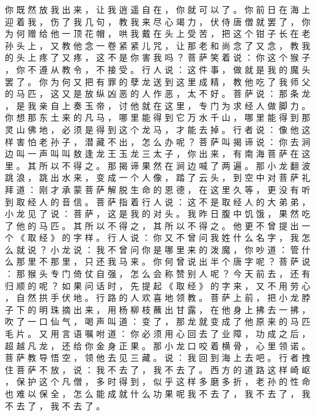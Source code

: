{你 既 然 放 我 出 来 ， 让 我 逍 遥 自 在 ， 你 就 可 以 了 。
你 前 日 在 海 上 迎 着 我 ， 伤 了 我 几 句 ， 教 我 来 尽 心 竭 力 ， 伏 侍 唐 僧 就 罢 了 ， 你 为 何 赠 给 他 一 顶 花 帽 ， 哄 我 戴 在 头 上 受 苦 ， 把 这 个 钳 子 长 在 老 孙 头 上 ， 又 教 他 念 一 卷 紧 紧 儿 咒 ， 让 那 老 和 尚 念 了 又 念 ， 教 我 的 头 上 疼 了 又 疼 ， 这 不 是 你 害 我 吗 ？ 菩 萨 笑 着 说 ： 你 这 个 猴 子 ， 你 不 遵 从 教 令 ， 不 接 受 。
行 人 说 ： 这 件 事 ， 做 就 是 我 的 魔 头 罢 了 。
你 为 何 又 把 有 罪 的 孽 龙 送 到 这 里 成 精 ， 教 他 吃 了 我 师 父 的 马 匹 ， 这 又 是 放 纵 凶 恶 的 人 作 恶 ， 太 不 好 。
菩 萨 说 ： 那 条 龙 ， 是 我 亲 自 上 奏 玉 帝 ， 讨 他 就 在 这 里 ， 专 门 为 求 经 人 做 脚 力 。
你 想 那 东 土 来 的 凡 马 ， 哪 里 能 得 到 它 万 水 千 山 ， 哪 里 能 得 到 那 灵 山 佛 地 ， 必 须 是 得 到 这 个 龙 马 ， 才 能 去 掉 。
行 者 说 ： 像 他 这 样 害 怕 老 孙 子 ， 潜 藏 不 出 ， 怎 么 办 呢 ？ 菩 萨 叫 揭 谛 说 ： 你 去 涧 边 叫 一 声 叫 叫 敖 逢 龙 王 玉 龙 三 太 子 ， 你 出 来 ， 有 南 海 菩 萨 在 这 里 。
其 所 以 不 得 之 。
那 揭 谛 果 然 在 涧 边 喊 了 两 遍 。
那 小 龙 翻 波 跳 浪 ， 跳 出 水 来 ， 变 成 一 个 人 像 ， 踏 了 云 头 ， 到 空 中 对 菩 萨 礼 拜 道 ： 刚 才 承 蒙 菩 萨 解 脱 生 命 的 恩 德 ， 在 这 里 久 等 ， 更 没 有 听 到 取 经 人 的 音 信 。
菩 萨 指 着 行 人 说 ： 这 不 是 取 经 人 的 大 弟 弟 ， 小 龙 见 了 说 ： 菩 萨 ， 这 是 我 的 对 头 。
我 昨 日 腹 中 饥 饿 ， 果 然 吃 了 他 的 马 匹 。
其 所 以 不 得 之 ， 其 所 以 不 得 之 。
他 更 不 曾 提 出 一 个 《 取 经 》 的 字 样 。
行 人 说 ： 你 又 不 曾 问 我 姓 什 么 名 字 ， 我 怎 么 就 说 ？ 小 龙 说 ： 我 不 曾 问 你 是 哪 里 来 的 泼 魔 ， 你 吵 道 ： 管 什 么 那 里 不 那 里 ， 只 还 我 马 来 。
你 何 曾 说 出 半 个 唐 字 呢 ？ 菩 萨 说 ： 那 猴 头 专 门 倚 仗 自 强 ， 怎 么 会 称 赞 别 人 呢 ？ 今 天 前 去 ， 还 有 归 顺 的 呢 ？
如 果 问 话 时 ， 先 提 起 《 取 经 》 的 字 来 ， 又 不 用 劳 心 ， 自 然 拱 手 伏 地 。
行 路 的 人 欢 喜 地 领 教 。
菩 萨 上 前 ， 把 小 龙 脖 子 下 的 明 珠 摘 出 来 ， 用 杨 柳 枝 蘸 出 甘 露 ， 在 他 身 上 拂 去 一 拂 ， 吹 了 一 口 仙 气 ， 喝 声 叫 道 ： 变 了 ， 那 龙 就 变 成 了 他 原 来 的 马 匹 毛 片 。
又 用 言 语 嘱 咐 道 ： 你 必 须 用 心 回 去 了 业 障 ， 功 成 之 后 ， 超 越 凡 龙 ， 还 给 你 金 身 正 果 。
那 小 龙 口 咬 着 横 骨 ， 心 里 领 诺 。
菩 萨 教 导 悟 空 ， 领 他 去 见 三 藏 。
说 ： 我 回 到 海 上 去 吧 。
行 者 拽 住 菩 萨 不 放 ， 说 ： 我 不 去 了 ， 我 不 去 了 。
西 方 的 道 路 这 样 崎 岖 ， 保 护 这 个 凡 僧 ， 多 时 得 到 ， 似 乎 这 样 多 磨 多 折 ， 老 孙 的 性 命 也 难 以 保 全 ， 怎 么 能 成 就 什 么 功 果 呢 我 不 去 了 ， 我 不 去 了 ， 我 不 去 了 ， 我 不 去 了 。
}
